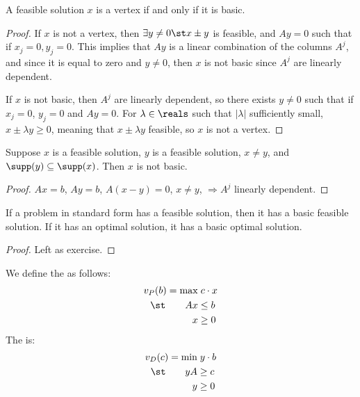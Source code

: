\documentclass[10pt]{article}
\begin{document}
\begin{theorem}
	A feasible solution $x$ is a vertex if and only if it is basic.
\end{theorem}
\begin{proof}
	If $x$ is not a vertex, then $\exists y \ne 0 \st x \pm y$ is feasible, and $Ay = 0$ such that if $x_j = 0, y_j = 0$. This implies that $Ay$ is a linear combination of the columns $A^j$, and since it is equal to zero and $y \ne 0$, then $x$ is not basic since $A^j$ are linearly dependent. 
	
	If $x$ is not basic, then $A^j$ are linearly dependent, so there exists $y \ne 0$ such that if $x_j = 0$, $y_j = 0$ and $Ay = 0$. For $\lambda \in \reals$ such that $|\lambda|$ sufficiently small, $x \pm \lambda y \ge 0$, meaning that $x \pm \lambda y$ feasible, so $x$ is not a vertex.
\end{proof}

\begin{proposition}
	Suppose $x$ is a feasible solution, $y$ is a feasible solution, $x \ne y$, and $\supp(y) \subseteq \supp(x)$. Then $x$ is not basic.
\end{proposition}
\begin{proof}
	$Ax = b$, $Ay = b$, $A(x-y) = 0$, $x \ne y$, $\Longrightarrow A^j$ linearly dependent.
\end{proof}

\begin{theorem}
	 If a problem in standard form has a feasible solution, then it has a basic feasible solution. If it has an optimal solution, it has a basic optimal solution.
\end{theorem}
\begin{proof}
	Left as exercise.
\end{proof}

\begin{definition}
We define the  as follows: 
\begin{align*}
	v_P(b) = \max &\; c \cdot x \\ \st \qquad Ax &\le b \\ x &\ge 0
\end{align*}
The  is:
\begin{align*}
	v_D(c) = \min&\; y \cdot b \\ \st \qquad yA &\ge c \\ y &\ge 0
\end{align*}
\end{definition}
\end{document}
